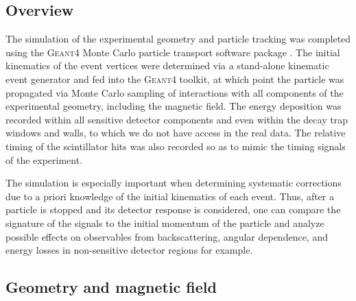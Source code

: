 \subsection{Overview}

The simulation of the experimental geometry and particle tracking was completed
using the \textsc{Geant4} Monte Carlo particle transport software package
\cite{agostinelli2003geant4}. The initial kinematics of the event vertices
were determined via a stand-alone kinematic event generator and fed into the \textsc{Geant4} toolkit, at which
point the particle was propagated via Monte Carlo sampling of interactions
with all components of the experimental geometry, including the magnetic field.
The energy deposition was recorded within all sensitive detector components and
even within the decay trap windows and walls, to which we do not have access
in the real data. The relative timing of the scintillator hits was also
recorded so as to mimic the timing signals of the experiment.

The simulation is especially important when determining systematic corrections due
to a priori knowledge of the initial kinematics of each event. Thus, after a particle
is stopped and its detector response is considered, one can compare the signature
of the signals to the initial momentum of the particle and analyze possible
effects on observables from backscattering, angular dependence, and energy losses
in non-sensitive detector regions for example.

\subsection{Geometry and magnetic field} \label{sssec:simMagField}

